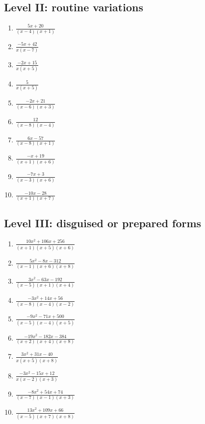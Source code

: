 \documentclass[11pt,oneside]{book}
\begin{document}
\subsection*{Level II: routine variations}
\begin{enumerate}[leftmargin=*,label=\textbf{\arabic*.},itemsep=0.65\baselineskip]
\item $\displaystyle \frac{5 x + 20}{\left(x - 4\right) \left(x + 1\right)}$
\item $\displaystyle \frac{- 5 x + 42}{x \left(x - 7\right)}$
\item $\displaystyle \frac{- 2 x + 15}{x \left(x + 5\right)}$
\item $\displaystyle \frac{5}{x \left(x + 5\right)}$
\item $\displaystyle \frac{- 2 x + 21}{\left(x - 6\right) \left(x + 3\right)}$
\item $\displaystyle \frac{12}{\left(x - 8\right) \left(x - 4\right)}$
\item $\displaystyle \frac{6 x - 57}{\left(x - 8\right) \left(x + 1\right)}$
\item $\displaystyle \frac{- x + 19}{\left(x + 1\right) \left(x + 6\right)}$
\item $\displaystyle \frac{- 7 x + 3}{\left(x - 3\right) \left(x + 6\right)}$
\item $\displaystyle \frac{- 10 x - 28}{\left(x + 1\right) \left(x + 7\right)}$
\end{enumerate}
\subsection*{Level III: disguised or prepared forms}
\begin{enumerate}[leftmargin=*,label=\textbf{\arabic*.},itemsep=0.65\baselineskip]
\item $\displaystyle \frac{10 x^{2} + 106 x + 256}{\left(x + 1\right) \left(x + 5\right) \left(x + 6\right)}$
\item $\displaystyle \frac{5 x^{2} - 8 x - 312}{\left(x - 1\right) \left(x + 6\right) \left(x + 8\right)}$
\item $\displaystyle \frac{3 x^{2} - 63 x - 192}{\left(x - 5\right) \left(x + 1\right) \left(x + 4\right)}$
\item $\displaystyle \frac{- 3 x^{2} + 14 x + 56}{\left(x - 8\right) \left(x - 4\right) \left(x - 2\right)}$
\item $\displaystyle \frac{- 9 x^{2} - 71 x + 500}{\left(x - 5\right) \left(x - 4\right) \left(x + 5\right)}$
\item $\displaystyle \frac{- 19 x^{2} - 182 x - 384}{\left(x + 2\right) \left(x + 4\right) \left(x + 8\right)}$
\item $\displaystyle \frac{3 x^{2} + 31 x - 40}{x \left(x + 5\right) \left(x + 8\right)}$
\item $\displaystyle \frac{- 3 x^{2} - 15 x + 12}{x \left(x - 2\right) \left(x + 3\right)}$
\item $\displaystyle \frac{- 8 x^{2} + 54 x + 74}{\left(x - 7\right) \left(x - 1\right) \left(x + 3\right)}$
\item $\displaystyle \frac{13 x^{2} + 109 x + 66}{\left(x - 5\right) \left(x + 7\right) \left(x + 8\right)}$
\end{enumerate}
\end{document}
